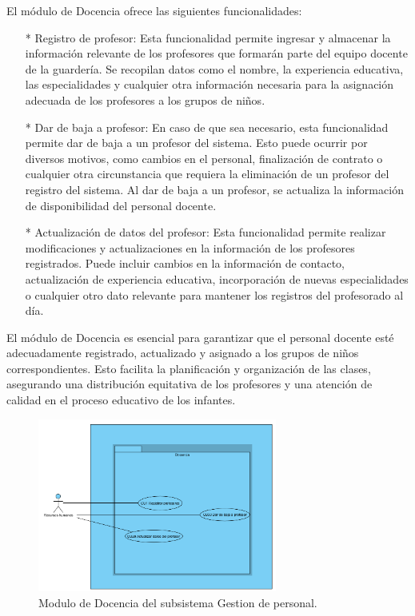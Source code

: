 El módulo de Docencia ofrece las siguientes funcionalidades:

\begin{itemize}
\item[*] Registro de profesor: Esta funcionalidad permite ingresar y almacenar la información relevante de los profesores que formarán parte del equipo docente de la guardería. Se recopilan datos como el nombre, la experiencia educativa, las especialidades y cualquier otra información necesaria para la asignación adecuada de los profesores a los grupos de niños.
\item[*] Dar de baja a profesor: En caso de que sea necesario, esta funcionalidad permite dar de baja a un profesor del sistema. Esto puede ocurrir por diversos motivos, como cambios en el personal, finalización de contrato o cualquier otra circunstancia que requiera la eliminación de un profesor del registro del sistema. Al dar de baja a un profesor, se actualiza la información de disponibilidad del personal docente.
\item[*] Actualización de datos del profesor: Esta funcionalidad permite realizar modificaciones y actualizaciones en la información de los profesores registrados. Puede incluir cambios en la información de contacto, actualización de experiencia educativa, incorporación de nuevas especialidades o cualquier otro dato relevante para mantener los registros del profesorado al día.
\end{itemize}

El módulo de Docencia es esencial para garantizar que el personal docente esté adecuadamente registrado, actualizado y asignado a los grupos de niños correspondientes. Esto facilita la planificación y organización de las clases, asegurando una distribución equitativa de los profesores y una atención de calidad en el proceso educativo de los infantes.

\begin{figure}[htbp]
\centering
\includegraphics[width=0.7\textwidth]{images/arqui/subConsulDoce.png}
\caption{Modulo de Docencia del subsistema Gestion de personal.}
\label{fig:subsistGestDoce}
\end{figure}


